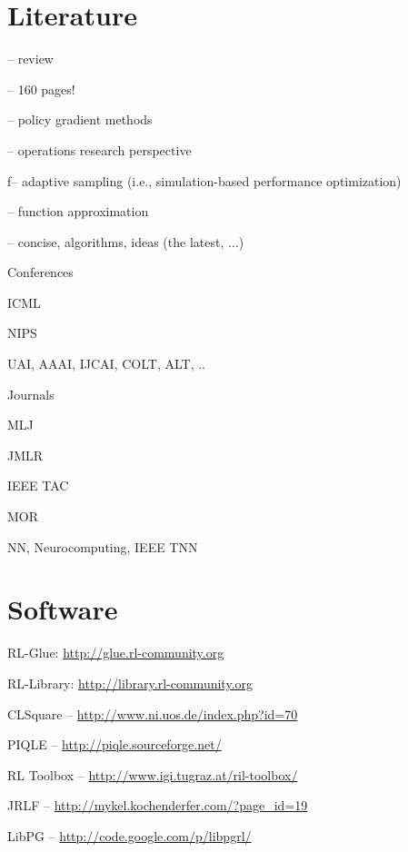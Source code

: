 \section{Literature}
{
\bi
\item \citeauthor{KaeLiMo96} -- review 
 \item \citet{berttsit96} 
 \item  \citet{SuBa98} 
 \item \citet{Ber07:DPbookVol1,Ber07:DPbookVol2}
 \item \citet{Ber10:DPbookVol2Ch6} -- 160 pages!
\item \cite{Gosavi03} 
\item  \citet{Cao07} -- policy gradient methods
\item 
\citet{Powell07} -- operations research perspective 
\item 
\citet{ChaFuHuMa08} f--  adaptive sampling (i.e., simulation-based performance optimization)
\item  \citet{BuBaSchEr10:RLFapp} -- function approximation
\item \citet{Sze10} -- concise, algorithms, ideas (the latest, $\ldots$)
\ei
}

{
\bi
\item Conferences
\bi
\item ICML
\item NIPS
\item UAI, AAAI, IJCAI, COLT, ALT, ..
\ei
\item Journals
\bi
\item MLJ
\item JMLR
\item IEEE TAC
\item MOR
\item NN, Neurocomputing, IEEE TNN
\ei
\ei
}

\section{Software}
{
\bi
 \item {\sc RL-Glue}: \url{http://glue.rl-community.org}
 \item  {\sc RL-Library}: \url{http://library.rl-community.org}
 \item   CLSquare -- {\url{http://www.ni.uos.de/index.php?id=70}}
 \item PIQLE -- {\url{http://piqle.sourceforge.net/}}
 \item  RL Toolbox -- {\url{http://www.igi.tugraz.at/ril-toolbox/}}
 \item  JRLF -- {\url{http://mykel.kochenderfer.com/?page_id=19}} 
 \item  LibPG -- {\url{http://code.google.com/p/libpgrl/}}
\ei
}

